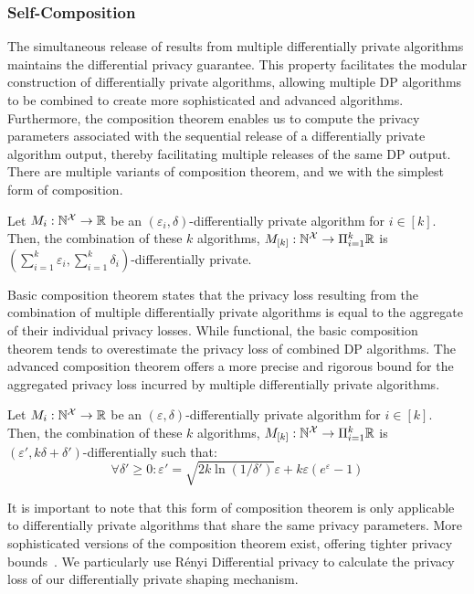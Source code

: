 \subsubsection{Self-Composition}
The simultaneous release of results from multiple differentially private algorithms maintains the differential privacy guarantee.
This property facilitates the modular construction of differentially private algorithms, allowing multiple DP algorithms to be combined to create more sophisticated and advanced algorithms.
Furthermore, the composition theorem enables us to compute the privacy parameters associated with the sequential release of a differentially private algorithm output, thereby facilitating multiple releases of the same DP output.
There are multiple variants of composition theorem, and we with the simplest form of composition.
\begin{proposition}
\label{prop:basic-composition}
  Let $M_i: \mathbb{N}^\mathcal{X} \rightarrow \mathbb{R}$ be an $(\varepsilon_i, \delta)$-differentially private algorithm for $i \in [k]$. Then, the combination of these $k$ algorithms, $M_{[k]}: \mathbb{N}^\mathcal{X} \rightarrow \Pi_{i=1}^{k}\mathbb{R}$ is $(\sum_{i=1}^{k}\varepsilon_i, \sum_{i=1}^{k}\delta_i)$-differentially private.  
\end{proposition}
Basic composition theorem states that the privacy loss resulting from the combination of multiple differentially private algorithms is equal to the aggregate of their individual privacy losses.
While functional, the basic composition theorem tends to overestimate the privacy loss of combined DP algorithms.
The advanced composition theorem offers a more precise and rigorous bound for the aggregated privacy loss incurred by multiple differentially private algorithms. 
\begin{proposition}
\label{prop:advanced-composition}
  Let $M_i: \mathbb{N}^\mathcal{X} \rightarrow \mathbb{R}$ be an $(\varepsilon, \delta)$-differentially private algorithm for $i \in [k]$. Then, the combination of these $k$ algorithms, $M_{[k]}: \mathbb{N}^\mathcal{X} \rightarrow \Pi_{i=1}^{k}\mathbb{R}$ is $(\varepsilon', k\delta+\delta')$-differentially such that:
  \begin{equation*}
    \forall \delta' \geq 0: \varepsilon' = \sqrt{2k\ln(1/\delta')}\varepsilon + k\varepsilon(e^{\varepsilon} - 1)
  \end{equation*}
\end{proposition}
It is important to note that this form of composition theorem is only applicable to differentially private algorithms that share the same privacy parameters.
More sophisticated versions of the composition theorem exist, offering tighter privacy bounds~\cite{kairouz2015composition, mironov2017renyi}.
We particularly use R{\'e}nyi Differential privacy to calculate the privacy loss of our differentially private shaping mechanism.